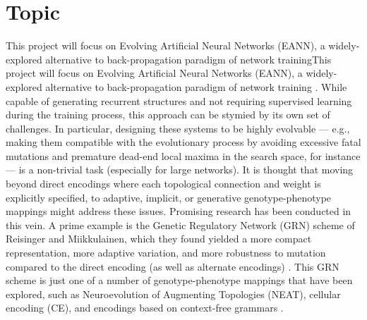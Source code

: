 \chapter{Topic}

 This project will focus on Evolving Artificial Neural Networks (EANN), a widely-explored alternative to back-propagation paradigm of network trainingThis project will focus on Evolving Artificial Neural Networks (EANN), a widely-explored alternative to back-propagation paradigm of network training \cite{Downing2015IntelligenceSystems}. While capable of generating recurrent structures and not requiring supervised learning during the training process, this approach can be stymied by its own set of challenges. In particular, designing these systems to be highly evolvable --- e.g., making them compatible with the evolutionary process by avoiding excessive fatal mutations and premature dead-end local maxima in the search space, for instance --- is a non-trivial task (especially for large networks). It is thought that moving beyond direct encodings where each topological connection and weight is explicitly specified, to adaptive, implicit, or generative genotype-phenotype mappings might address these issues. Promising research has been conducted in this vein. A prime example is the Genetic Regulatory Network (GRN) scheme of Reisinger and Miikkulainen, which they found yielded a more compact representation, more adaptive variation, and more robustness to mutation compared to the direct encoding (as well as alternate encodings) \cite{Reisinger2007AcquiringRepresentations}. This GRN scheme is just one of a number of genotype-phenotype mappings that have been explored, such as Neuroevolution of Augmenting Topologies (NEAT), cellular encoding (CE), and encodings based on context-free grammars \cite{Downing2015IntelligenceSystems}.